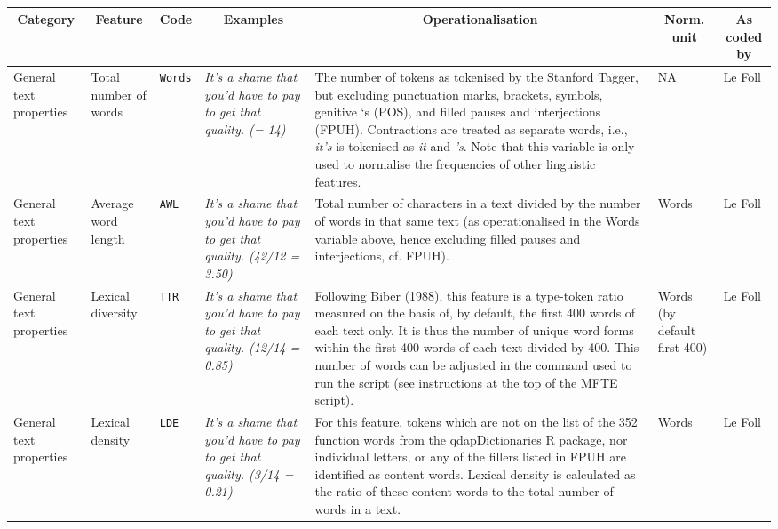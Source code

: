 \documentclass[
  letterpaper,
  DIV=11,
  numbers=noendperiod]{scrreprt}
\begin{document}
\begin{table}[htbp]
\caption{}
\begin{tabular}{|l|l|l|l|l|l|l|}
\hline
\multicolumn{1}{|c|}{\textbf{Category}} & \multicolumn{1}{c|}{\textbf{Feature}} & \multicolumn{1}{c|}{\textbf{Code}} & \multicolumn{1}{c|}{\textbf{Examples}} & \multicolumn{1}{c|}{\textbf{                     Operationalisation                     }} & \multicolumn{1}{c|}{\textbf{Norm. unit}} & \multicolumn{1}{c|}{\textbf{As coded by}} \\ \hline
General text properties & Total number of words & \texttt{Words} & \textit{It's a shame that you'd have to pay to get that quality. (= 14)} & The number of tokens as tokenised by the Stanford Tagger, but excluding punctuation marks, brackets, symbols, genitive ‘s (POS), and filled pauses and interjections (FPUH). Contractions are treated as separate words, i.e., \textit{it's} is tokenised as \textit{it} and \textit{'s}. Note that this variable is only used to normalise the frequencies of other linguistic features. & NA & Le Foll \\ \hline
General text properties & Average word length & \texttt{AWL} & \textit{It's a shame that you'd have to pay to get that quality. (42/12 = 3.50)} & Total number of characters in a text divided by the number of words in that same text (as operationalised in the Words variable above, hence excluding filled pauses and interjections, cf. FPUH). & Words & Le Foll \\ \hline
General text properties & Lexical diversity & \texttt{TTR} & \textit{It's a shame that you'd have to pay to get that quality. (12/14 = 0.85)} & Following Biber (1988), this feature is a type-token ratio measured on the basis of, by default, the first 400 words of each text only. It is thus the number of unique word forms within the first 400 words of each text divided by 400. This number of words can be adjusted in the command used to run the script (see instructions at the top of the MFTE script). & Words (by default first 400) & Le Foll \\ \hline
General text properties & Lexical density & \texttt{LDE} & \textit{It's a shame that you'd have to pay to get that quality. (3/14 = 0.21)} & For this feature, tokens which are not on the list of the 352 function words from the {qdapDictionaries} R package, nor individual letters, or any of the fillers listed in FPUH are identified as content words. Lexical density is calculated as the ratio of these content words to the total number of words in a text. & Words & Le Foll \\ \hline

\end{tabular}
\end{table}
\end{document}
